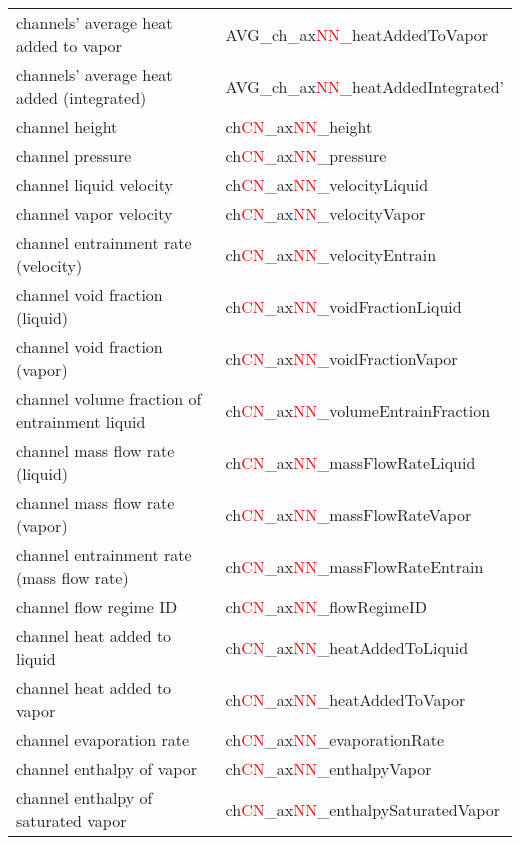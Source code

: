 \begin{longtable}{|l|l|}
      channels' average heat added to vapor & AVG\_ch\_ax\textcolor{red}{NN}\_heatAddedToVapor \\
      channels' average heat added (integrated)  & AVG\_ch\_ax\textcolor{red}{NN}\_heatAddedIntegrated' \\
      channel height & ch\textcolor{red}{CN}\_ax\textcolor{red}{NN}\_height \\
      channel pressure & ch\textcolor{red}{CN}\_ax\textcolor{red}{NN}\_pressure \\
      channel liquid velocity  & ch\textcolor{red}{CN}\_ax\textcolor{red}{NN}\_velocityLiquid \\
      channel vapor velocity  & ch\textcolor{red}{CN}\_ax\textcolor{red}{NN}\_velocityVapor \\
      channel entrainment rate (velocity) & ch\textcolor{red}{CN}\_ax\textcolor{red}{NN}\_velocityEntrain \\
      channel void fraction (liquid) & ch\textcolor{red}{CN}\_ax\textcolor{red}{NN}\_voidFractionLiquid \\
      channel void fraction (vapor)  & ch\textcolor{red}{CN}\_ax\textcolor{red}{NN}\_voidFractionVapor \\
      channel volume fraction of entrainment liquid  & ch\textcolor{red}{CN}\_ax\textcolor{red}{NN}\_volumeEntrainFraction \\
      channel mass flow rate (liquid) & ch\textcolor{red}{CN}\_ax\textcolor{red}{NN}\_massFlowRateLiquid \\
      channel mass flow rate (vapor)  & ch\textcolor{red}{CN}\_ax\textcolor{red}{NN}\_massFlowRateVapor \\
      channel entrainment rate (mass flow rate) & ch\textcolor{red}{CN}\_ax\textcolor{red}{NN}\_massFlowRateEntrain \\
      channel flow regime ID & ch\textcolor{red}{CN}\_ax\textcolor{red}{NN}\_flowRegimeID \\
      channel heat added to liquid & ch\textcolor{red}{CN}\_ax\textcolor{red}{NN}\_heatAddedToLiquid \\
      channel heat added to vapor  & ch\textcolor{red}{CN}\_ax\textcolor{red}{NN}\_heatAddedToVapor \\
      channel evaporation rate  & ch\textcolor{red}{CN}\_ax\textcolor{red}{NN}\_evaporationRate \\
      channel enthalpy of vapor  & ch\textcolor{red}{CN}\_ax\textcolor{red}{NN}\_enthalpyVapor \\
      channel enthalpy of saturated vapor & ch\textcolor{red}{CN}\_ax\textcolor{red}{NN}\_enthalpySaturatedVapor \\

\end{longtable}
